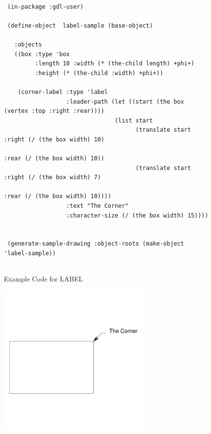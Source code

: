 \documentclass [11pt]{book}
\begin{document}
\begin{itemize}
\begin{figure}
\begin{lrbox}{\boxedverb}
\begin{minipage}{\linewidth}
{\begin{verbatim}        

 (in-package :gdl-user)
                   
 (define-object  label-sample (base-object)
  
   :objects
   ((box :type 'box
         :length 10 :width (* (the-child length) +phi+)
         :height (* (the-child :width) +phi+))
   
    (corner-label :type 'label
                  :leader-path (let ((start (the box (vertex :top :right :rear))))
                                (list start
                                      (translate start :right (/ (the box width) 10)
                                                       :rear (/ (the box width) 10))
                                      (translate start :right (/ (the box width) 7)
                                                       :rear (/ (the box width) 10))))
                  :text "The Corner"
                  :character-size (/ (the box width) 15))))


 (generate-sample-drawing :object-roots (make-object 'label-sample))


\end{verbatim}}
\end{minipage}
\end{lrbox}
\fbox{\usebox{\boxedverb}}

\caption{Example Code for LABEL}

\label{fig:example-code-LABEL}

\end{figure}

\begin{figure}
\begin{center}
\includegraphics[width=3in,height=3in]{../images/example-LABEL.pdf}
\end{center}


\end{figure}
\end{itemize}
\end{document}
